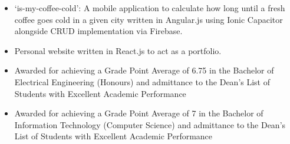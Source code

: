 
	

	\begin{itemize}
		\item `is-my-coffee-cold': A mobile application to calculate how long until a fresh coffee goes cold in a given city written in Angular.js using Ionic Capacitor alongside CRUD implementation via Firebase.		
		\item Personal website written in React.js to act as a portfolio.
	\end{itemize}

	\begin{itemize}
		\item  Awarded for achieving a Grade Point Average of 6.75 in the Bachelor of Electrical Engineering
 (Honours) and admittance to the Dean's List of Students with Excellent Academic
 Performance
	\end{itemize}
	\begin{itemize}
		\item  Awarded for achieving a Grade Point Average of 7 in the Bachelor of Information Technology
 (Computer Science) and admittance to the Dean's List of Students with Excellent Academic
 Performance
	\end{itemize}

